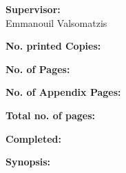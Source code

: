 \begin{titlepage}
\begin{minipage}{0.4\textwidth}
\begin{description}
			\item {\bf Supervisor:}\\
			Emmanouil Valsomatzis\\

			\item {\bf No. printed Copies:} \rprints
			\item {\bf No. of Pages:} \rlastpage
			\item {\bf No. of Appendix Pages:} \rappendices
			\item {\bf Total no. of pages:} \pageref{LastPage}
			\item {\bf Completed:} \rdeadline
		\end{description}
	\end{minipage}
	\hfill
	\begin{minipage}{0.4\textwidth}
		\textbf{Synopsis:}\bigskip\bigskip
		\vfill
		\fbox{
		\begin{minipage}{\textwidth}
			\vspace{5pt}
			\small 
			\vspace{5pt}
		\end{minipage}}
	\end{minipage}
	\newline\newline\newline
\end{titlepage}
